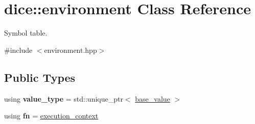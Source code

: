 \hypertarget{classdice_1_1environment}{}\section{dice\+:\+:environment Class Reference}
\label{classdice_1_1environment}


Symbol table.  




{\ttfamily \#include $<$environment.\+hpp$>$}

\subsection*{Public Types}
\begin{DoxyCompactItemize}
\item 
\mbox{\label{classdice_1_1environment_ac54829c038694e9919e1fa61ee5c6483}} 
using {\bfseries value\+\_\+type} = std\+::unique\+\_\+ptr$<$ \mbox{\hyperlink{classdice_1_1base__value}{base\+\_\+value}} $>$
\item 
\mbox{\label{classdice_1_1environment_a3288064477909334766a0f5f37eadd24}} 
using {\bfseries fn} = \mbox{\hyperlink{classdice_1_1execution__context}{execution\+\_\+context}}
\end{DoxyCompactItemize}
